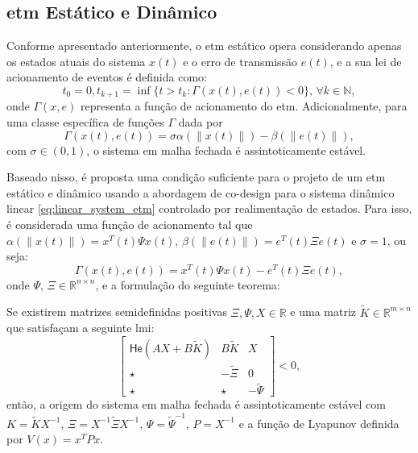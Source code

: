
\subsection{\acrshort{etm} Estático e Dinâmico}

Conforme apresentado anteriormente, o \acrshort{etm} estático opera considerando apenas os estados atuais do sistema $x(t)$ e o erro de transmissão $e(t)$, e a sua lei de acionamento de eventos é definida como: \begin{equation} t_0 = 0, t_{k+1} = \inf \{t > t_k : \Gamma(x(t), e(t)) < 0 \}, \, \forall k \in \mathbb{N}, \label{eq:static_etm}\end{equation} onde $\Gamma(x, e)$ representa a função de acionamento do \acrshort{etm}. Adicionalmente, para uma classe específica de funções $\Gamma$ dada por \begin{equation}
  \Gamma(x(t), e(t)) = \sigma \alpha(\|x(t)\|) - \beta(\|e(t)\|),
\end{equation} com $\sigma \in (0,1)$, o sistema em malha fechada é assintoticamente estável.

Baseado nisso, é proposta uma condição suficiente para o projeto de um \acrshort{etm} estático e dinâmico usando a abordagem de co-design para o sistema dinâmico linear \eqref{eq:linear_system_etm} controlado por realimentação de estados. Para isso, é considerada uma função de acionamento tal que $\alpha(\|x(t)\|) = x^T(t)\Psi x(t)$, $\beta(\|e(t)\|) = e^T(t)\Xi e(t)$ e $\sigma = 1$, ou seja:  \begin{equation}
  \Gamma(x(t), e(t)) = x^T(t)\Psi x(t) - e^T(t)\Xi e(t),
  \label{eq:etm_gamma}
\end{equation}  onde $\Psi, \, \Xi \in \mathbb{R}^{n \times n}$, e a formulação do seguinte teorema:

\begin{theorem}
  \label{theorem:etm_stability}
  Se existirem matrizes semidefinidas positivas $\Xi, \Psi, X \in \mathbb{R}$ e uma matriz $\tilde{K} \in \mathbb{R}^{m \times n}$ que satisfaçam a seguinte \acrshort{lmi}:
  \begin{equation}
    \begin{bmatrix}
      \mathsf{He}(AX +B\tilde{K}) & B\tilde{K}   & X             \\
      \star                       & -\tilde{\Xi} & 0             \\
      \star                       & \star        & -\tilde{\Psi}
    \end{bmatrix} < 0,
    \label{eq:etm_lmi_1}
  \end{equation}
  então, a origem do sistema em malha fechada é assintoticamente estável com $K = \tilde{K}X^{-1}$, $\Xi= X^{-1}\tilde{\Xi}X^{-1}$, $\Psi = \tilde{\Psi}^{-1}$, $P = X^{-1}$ e a função de Lyapunov definida por $V(x)=x^TPx$.
\end{theorem}

